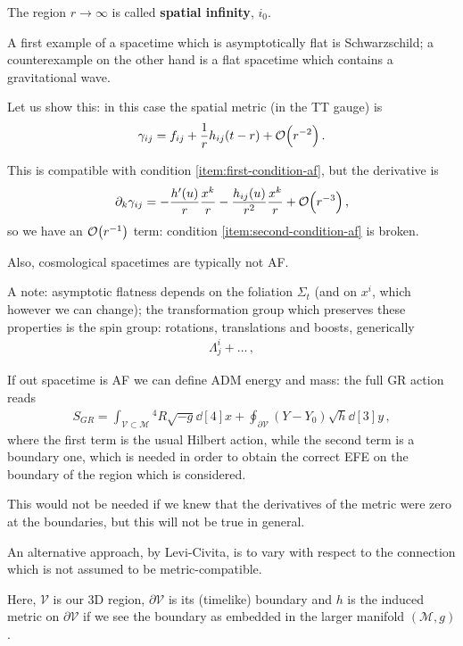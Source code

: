 \documentclass[main.tex]{subfiles}
\begin{document}
The region \(r \to \infty \) is called \textbf{spatial infinity}, \(i_0\).

A first example of a spacetime which is asymptotically flat is Schwarzschild; a counterexample on the other hand is a flat spacetime which contains a gravitational wave. 

Let us show this: in this case the spatial metric (in the TT gauge) is 
%
\begin{align}
\gamma_{ij} = f_{ij} + \frac{1}{r} h_{ij}(t-r) + \order{r^{-2}}
\,.
\end{align}

This is compatible with condition \ref{item:first-condition-af}, but the derivative is 
%
\begin{align}
\partial_{k} \gamma_{ij} = - \frac{h'(u)}{r} \frac{x^{k}}{r} - \frac{h_{ij}(u)}{r^2} \frac{x^{k}}{r} + \order{r^{-3}}
\,,
\end{align}
%
so we have an \(\order{r^{-1}}\) term: condition \ref{item:second-condition-af} is broken.

Also, cosmological spacetimes are typically not AF. 

A note: asymptotic flatness depends on the foliation \(\Sigma _t\) (and on \(x^{i}\), which however we can change); the transformation group which preserves these properties is the spin group: rotations, translations and boosts, generically
%
\begin{align}
\Lambda^{i}_{j} + \dots
\,,
\end{align}
%

If out spacetime is AF we can define ADM energy and mass: the full GR action reads
%
\begin{align}
S_{GR} = \int_{\mathcal{V} \subset \mathcal{M}} {}^4R \sqrt{-g} \dd[4]{x} + \oint_{\partial \mathcal{V}} (Y - Y_0 ) \sqrt{h} \dd[3]{y} 
\,,
\end{align}
%
where the first term is the usual Hilbert action, while the second term is a boundary one, which is needed in order to obtain the correct EFE on the boundary of the region which is considered. 

This would not be needed if we knew that the derivatives of the metric were zero at the boundaries, but this will not be true in general. 

An alternative approach, by Levi-Civita, is to vary with respect to the connection which is not assumed to be metric-compatible.

Here, \(\mathcal{V}\) is our 3D region, \(\partial \mathcal{V}\) is its (timelike) boundary and \(h\) is the induced metric on \(\partial \mathcal{V}\) if we see the boundary as embedded in the larger manifold \((\mathcal{M}, g)\). 
\end{document}
